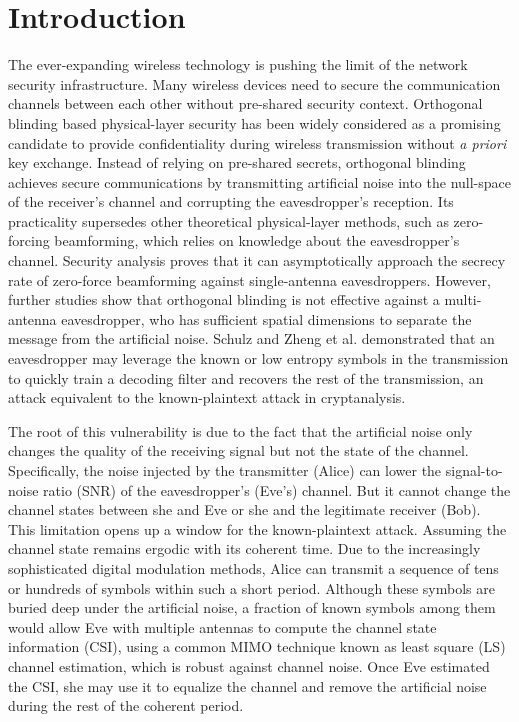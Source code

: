 \section{Introduction}
The ever-expanding wireless technology is pushing the limit of the network security infrastructure. Many wireless devices need to secure the communication channels between each other without pre-shared security context. Orthogonal blinding based physical-layer security \cite{negi2005secret,goel2008guaranteeing,liao2010qos,li2011safe,anand2012strobe,argyraki2013creating} has been widely considered as a promising candidate to provide confidentiality during wireless transmission without \textit{a priori} key exchange. Instead of relying on pre-shared secrets, orthogonal blinding achieves secure communications by transmitting artificial noise into the null-space of the receiver's channel and  corrupting the eavesdropper's reception. Its practicality supersedes other theoretical physical-layer methods, such as zero-forcing beamforming,  which relies on knowledge about the eavesdropper's channel. Security analysis proves that it can asymptotically approach the secrecy rate of zero-force beamforming against single-antenna eavesdroppers. However, further studies show that orthogonal blinding is not effective against a multi-antenna eavesdropper, who has sufficient spatial dimensions to separate the message from the artificial noise. Schulz and Zheng et al. \cite{schulz2014practical, ZhengHighlyEfficientKnownPlaintext2015, zheng2016profiling} demonstrated that an eavesdropper may leverage the known or low entropy symbols in the transmission to quickly train a decoding filter and recovers the rest of the transmission, an attack equivalent to the known-plaintext attack in cryptanalysis.

The root of this vulnerability is due to the fact that the artificial noise only changes the quality of the receiving signal but not the state of the channel. Specifically, the noise injected by the transmitter (Alice) can lower the signal-to-noise ratio (SNR) of the eavesdropper's (Eve's) channel. But it cannot change the channel states between she and Eve or she and the legitimate receiver (Bob). This limitation opens up a window for the known-plaintext attack. Assuming the channel state remains ergodic with its coherent time. Due to the increasingly sophisticated digital modulation methods, Alice can transmit a sequence of tens or hundreds of symbols within such a short period. Although these symbols are buried deep under the artificial noise, a fraction of known symbols among them would allow Eve with multiple antennas to compute the channel state information (CSI), using a common MIMO technique known as least square (LS) channel estimation, which is robust against channel noise. Once Eve estimated the CSI, she may use it to equalize the channel and remove the artificial noise during the rest of the coherent period.

